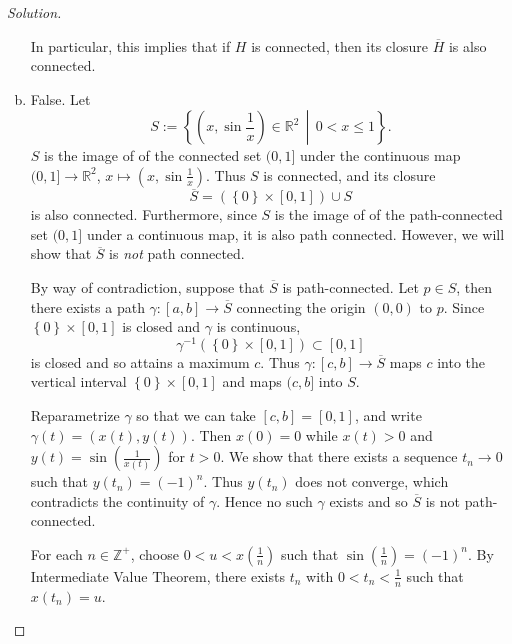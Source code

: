 \documentclass[12pt]{article}
\newcommand{\z}{\mathbb{Z}}
\newcommand{\real}{\mathbb{R}}
\newcommand{\ita}[1]{\textit{#1}}
\newcommand\inv[1]{#1^{-1}}
\newcommand\paren[1]{\left( #1 \right)}
\newcommand\setb[1]{\left \{ #1 \right \}}
\theoremstyle{definition}
\begin{document}
\begin{proof}[Solution]
\begin{enumerate}[a)]
        In particular, this implies that if $H$ is connected, then its closure $\overline{H}$ is also connected.
        \item False. Let 
        \[
            S := \setb{ \paren{ x , \sin \frac{1}{x} } \in \real^2 \, \middle| \, 0 < x \leq 1 }.
        \]
        $S$ is the image of of the connected set $(0,1]$ under the continuous map $(0,1] \to \real^2$, $x \mapsto \paren{ x , \sin \frac{1}{x} }$. Thus $S$ is connected, and its closure 
        \[
            \overline{S} = \paren{ \setb{ 0 } \times [0,1] } \cup S
        \]
        is also connected. Furthermore, since $S$ is the image of of the path-connected set $(0,1]$ under a continuous map, it is also path connected. However, we will show that $\overline{S}$ is \ita{not} path connected.
        
        By way of contradiction, suppose that $\overline{S}$ is path-connected. Let $p \in S$, then there exists a path $\gamma : [a,b] \to \overline{S}$ connecting the origin $(0,0)$ to $p$. Since $\setb{0} \times [0,1]$ is closed and $\gamma$ is continuous,
        \[
            \inv{\gamma} \paren{ \setb{0} \times [0,1] } \subset [0,1]
        \]
        is closed and so attains a maximum $c$. Thus $\gamma : [c,b] \to \overline{S}$ maps $c$ into the vertical interval $\setb{ 0 } \times [0,1]$ and maps $(c,b]$ into $S$. 
        
        Reparametrize $\gamma$ so that we can take $[c,b] = [0,1]$, and write $\gamma(t) = (x(t),y(t))$. Then $x(0) = 0$ while $x(t) > 0$ and $y(t) = \sin \paren{ \frac{1}{x(t)} }$ for $t > 0$. We show that there exists a sequence $t_n \to 0$ such that $y(t_n) = \paren{-1}^n$. Thus $y(t_n)$ does not converge, which contradicts the continuity of $\gamma$. Hence no such $\gamma$ exists and so $\overline{S}$ is not path-connected.
        
        For each $n \in \z^+$, choose $0 < u < x \paren{ \frac{1}{n} }$ such that $\sin \paren{ \frac{1}{n} } = (-1)^n$. By Intermediate Value Theorem, there exists $t_n$ with $0 < t_n < \frac{1}{n}$ such that $x(t_n) = u$.
    \end{enumerate}
\end{proof}
\end{document}
